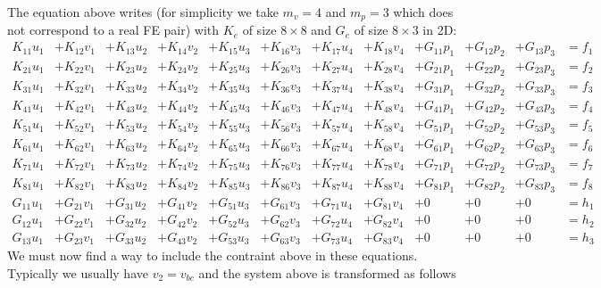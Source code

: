 The equation above writes (for simplicity we take $m_v=4$ and $m_p=3$ which does not correspond to a real FE pair) 
with $K_e$ of size $8\times 8$ and $G_e$ of size $8\times 3$ in 2D:
{\small
\[
\begin{array}{ccccccccccccc}
K_{11} u_1 &+ K_{12} v_1 &+ K_{13} u_2 &+ K_{14} v_2 &+ K_{15} u_3 &+ K_{16} v_3 &+ K_{17}u_4  &+ K_{18}v_4  
&+ G_{11}p_1 &+ G_{12} p_2 &+ G_{13} p_3 & =  f_1 \\
K_{21} u_1 &+ K_{22} v_1 &+ K_{23} u_2 &+ K_{24} v_2 &+ K_{25} u_3 &+ K_{26} v_3 &+ K_{27}u_4  &+ K_{28}v_4  
&+ G_{21}p_1 &+ G_{22} p_2 &+ G_{23} p_3 & =  f_2 \\
K_{31} u_1 &+ K_{32} v_1 &+ K_{33} u_2 &+ K_{34} v_2 &+ K_{35} u_3 &+ K_{36} v_3 &+ K_{37}u_4  &+ K_{38}v_4  
&+ G_{31}p_1 &+ G_{32} p_2 &+ G_{33} p_3 & =  f_3 \\
K_{41} u_1 &+ K_{42} v_1 &+ K_{43} u_2 &+ K_{44} v_2 &+ K_{45} u_3 &+ K_{46} v_3 &+ K_{47}u_4  &+ K_{48}v_4  
&+ G_{41}p_1 &+ G_{42} p_2 &+ G_{43} p_3 & =  f_4 \\
K_{51} u_1 &+ K_{52} v_1 &+ K_{53} u_2 &+ K_{54} v_2 &+ K_{55} u_3 &+ K_{56} v_3 &+ K_{57}u_4  &+ K_{58}v_4  
&+ G_{51}p_1 &+ G_{52} p_2 &+ G_{53} p_3 & =  f_5 \\
K_{61} u_1 &+ K_{62} v_1 &+ K_{63} u_2 &+ K_{64} v_2 &+ K_{65} u_3 &+ K_{66} v_3 &+ K_{67}u_4  &+ K_{68}v_4  
&+ G_{61}p_1 &+ G_{62} p_2 &+ G_{63} p_3 & =  f_6 \\
K_{71} u_1 &+ K_{72} v_1 &+ K_{73} u_2 &+ K_{74} v_2 &+ K_{75} u_3 &+ K_{76} v_3 &+ K_{77}u_4  &+ K_{78}v_4  
&+ G_{71}p_1 &+ G_{72} p_2 &+ G_{73} p_3 & =  f_7 \\
K_{81} u_1 &+ K_{82} v_1 &+ K_{83} u_2 &+ K_{84} v_2 &+ K_{85} u_3 &+ K_{86} v_3 &+ K_{87}u_4  &+ K_{88}v_4  
&+ G_{81}p_1 &+ G_{82} p_2 &+ G_{83} p_3 & =  f_8 \\
G_{11}u_1 &+ G_{21}v_1 &+ G_{31}u_2 &+ G_{41}v_2 &+ G_{51}u_3 &+ G_{61}v_3 &+ G_{71}u_4 &+ G_{81}v_4 &+0&+0&+0&= h_1 \\
G_{12}u_1 &+ G_{22}v_1 &+ G_{32}u_2 &+ G_{42}v_2 &+ G_{52}u_3 &+ G_{62}v_3 &+ G_{72}u_4 &+ G_{82}v_4 &+0&+0&+0&= h_2 \\
G_{13}u_1 &+ G_{23}v_1 &+ G_{33}u_2 &+ G_{43}v_2 &+ G_{53}u_3 &+ G_{63}v_3 &+ G_{73}u_4 &+ G_{83}v_4 &+0&+0&+0&= h_3
\end{array}
\]
}
We must now find a way to include the contraint above in these equations.
Typically we usually have $v_2=v_{bc}$ and the system above is transformed as follows
